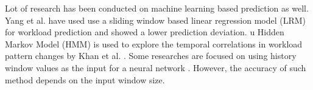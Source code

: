 Lot of research has been conducted on machine learning based prediction as well. Yang et al. \cite{Yang_2013} have used use a sliding window based linear regression model (LRM) for workload prediction and showed a lower prediction deviation. u Hidden Markov Model (HMM) is used to explore the temporal correlations in workload pattern changes by Khan et al. \cite{Khan_2012}. Some  researches are focused on using history window values as the input for a neural network \cite{Islam_2012}. However, the accuracy of such method depends on the input window size.\\